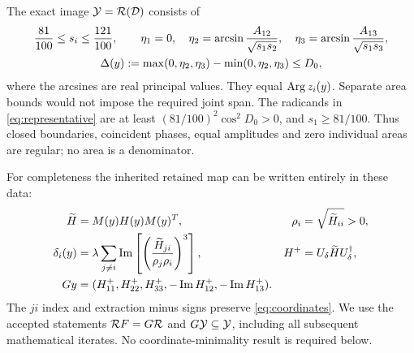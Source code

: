 The exact image \(\mathcal Y=\mathcal R(\mathcal D)\) consists of
\begin{gather}
\frac{81}{100}\le s_i\le\frac{121}{100},\qquad
\eta_1=0,\quad
\eta_2=\arcsin\frac{A_{12}}{\sqrt{s_1s_2}},\quad
\eta_3=\arcsin\frac{A_{13}}{\sqrt{s_1s_3}},\notag\\
\Delta(y):=\max(0,\eta_2,\eta_3)-\min(0,\eta_2,\eta_3)\le D_0,
\label{eq:jointimage}
\end{gather}
where the arcsines are real principal values. They equal \(\operatorname{Arg} z_i(y)\). Separate area bounds would not impose the required joint span. The radicands in \eqref{eq:representative} are at least \((81/100)^2\cos^2D_0>0\), and \(s_1\ge81/100\). Thus closed boundaries, coincident phases, equal amplitudes and zero individual areas are regular; no area is a denominator.

For completeness the inherited retained map can be written entirely in these data:
\begin{align}
\widetilde H&=M(y)H(y)M(y)^T,&\rho_i&=\sqrt{\widetilde H_{ii}}>0,\notag\\
\delta_i(y)&=\lambda\sum_{j\ne i}\operatorname{Im}\left[
\left(\frac{\widetilde H_{ji}}{\rho_j\rho_i}\right)^3\right],&
H^+&=U_\delta\widetilde H U_\delta^\dagger,\label{eq:coherenceupdate}\\
Gy&=(H^+_{11},H^+_{22},H^+_{33},-\operatorname{Im} H^+_{12},-\operatorname{Im} H^+_{13}).&&\notag
\end{align}
The \(ji\) index and extraction minus signs preserve \eqref{eq:coordinates}. We use the accepted statements \(\mathcal R F=G\mathcal R\) and \(G\mathcal Y\subseteq\mathcal Y\), including all subsequent mathematical iterates. No coordinate-minimality result is required below.
